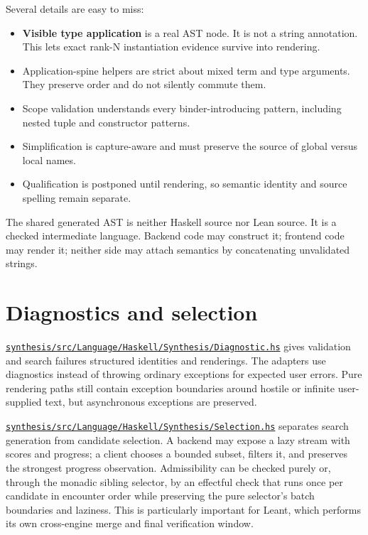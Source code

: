 \documentclass[10pt,letterpaper,oneside]{report}
\def\DjexBase{https://github.com/VladimirReshetnikov/Djex/blob/e454757d53ec057238c22fc6cd0d935b7d96b3dc/}
\newcommand{\dpath}[1]{\href{\DjexBase#1}{\nolinkurl{#1}}}
\newcommand{\term}[1]{\textbf{#1}}
\begin{document}
Several details are easy to miss:

\begin{itemize}
  \item \term{Visible type application} is a real AST node. It is not a string annotation. This lets exact rank-N instantiation evidence survive into rendering.
  \item Application-spine helpers are strict about mixed term and type arguments. They preserve order and do not silently commute them.
  \item Scope validation understands every binder-introducing pattern, including nested tuple and constructor patterns.
  \item Simplification is capture-aware and must preserve the source of global versus local names.
  \item Qualification is postponed until rendering, so semantic identity and source spelling remain separate.
\end{itemize}

\begin{invariantbox}
The shared generated AST is neither Haskell source nor Lean source. It is a checked intermediate language. Backend code may construct it; frontend code may render it; neither side may attach semantics by concatenating unvalidated strings.
\end{invariantbox}

\section{Diagnostics and selection}

\dpath{synthesis/src/Language/Haskell/Synthesis/Diagnostic.hs} gives validation and search failures structured identities and renderings. The adapters use diagnostics instead of throwing ordinary exceptions for expected user errors. Pure rendering paths still contain exception boundaries around hostile or infinite user-supplied text, but asynchronous exceptions are preserved.

\dpath{synthesis/src/Language/Haskell/Synthesis/Selection.hs} separates search generation from candidate selection. A backend may expose a lazy stream with scores and progress; a client chooses a bounded subset, filters it, and preserves the strongest progress observation. Admissibility can be checked purely or, through the monadic sibling selector, by an effectful check that runs once per candidate in encounter order while preserving the pure selector's batch boundaries and laziness. This is particularly important for Leant, which performs its own cross-engine merge and final verification window.
\end{document}
